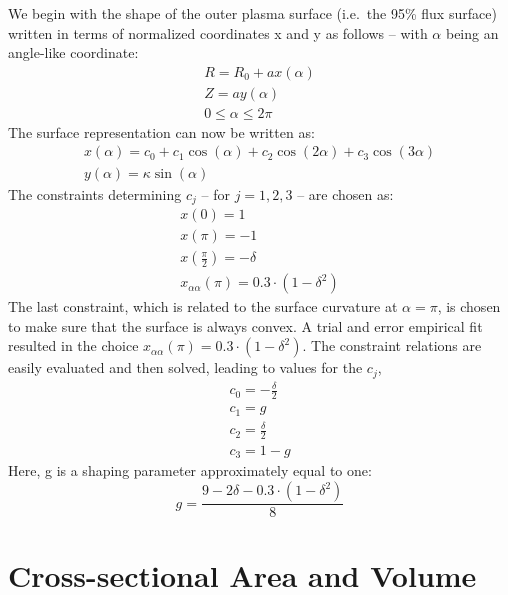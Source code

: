 We begin with the shape of the outer plasma surface (i.e.\ the 95\% flux surface) written in terms of normalized coordinates x and y as follows -- with $\alpha$ being an angle-like coordinate:
\begin{gather}
	R = R_0 + a x( \alpha ) \\
	Z = a y( \alpha ) \\
	0 \le \alpha \le 2 \pi
\end{gather}
The surface representation can now be written as:
\begin{gather}
	\label{eq:xalpha}
	x(\alpha) = c_0 + c_1 \cos(\alpha) + c_2 \cos(2\alpha) + c_3 \cos(3\alpha) \\
	\label{eq:yalpha}
	y(\alpha) = \kappa \sin(\alpha)
\end{gather}
The constraints determining $c_j$ -- for $j = 1,2,3$ -- are chosen as:
\begin{gather}
	x(0) = 1 \\
	x(\pi) = -1 \\
	x\left(\frac{\pi}{2}\right) = -\delta \\
	x_{\alpha\alpha}(\pi) = 0.3 \cdot ( 1 - \delta ^2 )
\end{gather}
The last constraint, which is related to the surface curvature at $\alpha = \pi$, is chosen to make sure that the surface is always convex. A trial and error empirical fit resulted in the choice $x_{\alpha\alpha}(\pi) = 0.3 \cdot ( 1 - \delta ^2 )$. The constraint relations are easily evaluated and then solved, leading to values for the $c_j$,
\begin{gather}
	c_0 = { - \frac{ \delta }{ 2 } } \\
	c_1 = g \\
	c_2 = { \frac{ \delta }{ 2 } } \\
	c_3 = 1 - g
\end{gather}
Here, g is a shaping parameter approximately equal to one:
\begin{equation}
	g = \frac{9 - 2 \delta - 0.3 \cdot ( 1 - \delta ^2 ) }{8}
  \label{eq:gg}
\end{equation}

\section{Cross-sectional Area and Volume}


